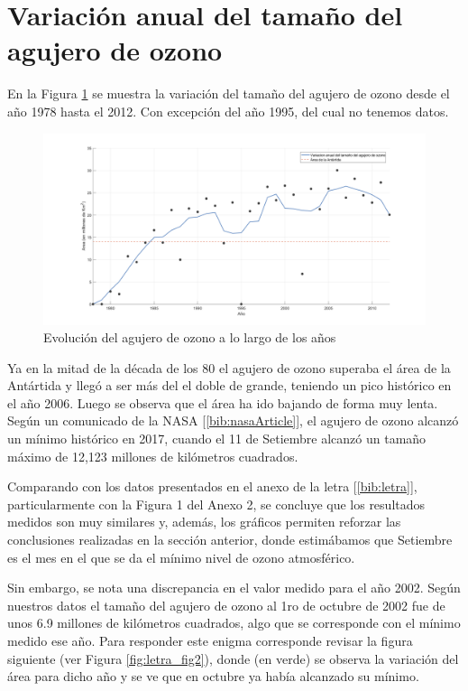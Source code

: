 \documentclass[a4paper]{article}
\begin{document}
\newpage
\section{Variación anual del tamaño del agujero de ozono}
\label{section:parte2}

En la Figura \ref{fig:variacionOzono} se muestra la variación del tamaño del agujero de ozono desde el año 1978 hasta el 2012. Con excepción del año 1995, del cual no tenemos datos.

\begin{figure}[ht]
\centering
\includegraphics[width=1\textwidth]{assets/variacionOzono.png}
\caption{\label{fig:variacionOzono}Evolución del agujero de ozono a lo largo de los años}
\end{figure}

Ya en la mitad de la década de los 80 el agujero de ozono superaba el área de la Antártida y llegó a ser más del el doble de grande, teniendo un pico histórico en el año 2006. Luego se observa que el área ha ido bajando de forma muy lenta. Según un comunicado de la NASA [\ref{bib:nasaArticle}], el agujero de ozono alcanzó un mínimo histórico en 2017, cuando el 11 de Setiembre alcanzó un tamaño máximo de 12,123 millones de kilómetros cuadrados.

Comparando con los datos presentados en el anexo de la letra [\ref{bib:letra}], particularmente con la Figura 1 del Anexo 2, se concluye que los resultados medidos son muy similares y, además, los gráficos permiten reforzar las conclusiones realizadas en la sección anterior, donde estimábamos que Setiembre es el mes en el que se da el mínimo nivel de ozono atmosférico.

Sin embargo, se nota una discrepancia en el valor medido para el año 2002. Según nuestros datos el tamaño del agujero de ozono al 1ro de octubre de 2002 fue de unos 6.9 millones de kilómetros cuadrados, algo que se corresponde con el mínimo medido ese año. Para responder este enigma corresponde revisar la figura siguiente (ver Figura \ref{fig:letra_fig2}), donde (en verde) se observa la variación del área para dicho año y se ve que en octubre ya había alcanzado su mínimo.
\end{document}
